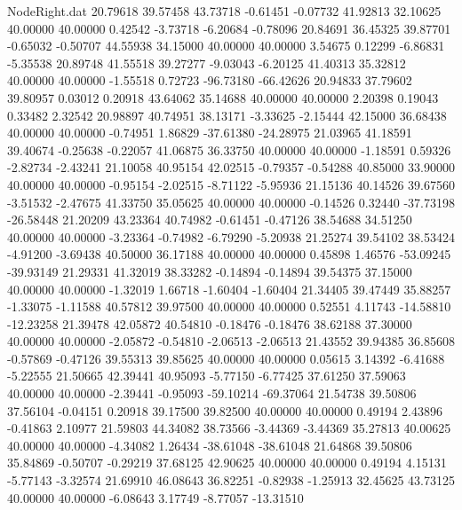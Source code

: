 \begin{filecontents}{NodeRight.dat}
  20.79618   39.57458   43.73718    -0.61451   -0.07732   41.92813   32.10625   40.00000   40.00000    0.42542   -3.73718   -6.20684   -0.78096
  20.84691   36.45325   39.87701    -0.65032   -0.50707   44.55938   34.15000   40.00000   40.00000    3.54675    0.12299   -6.86831   -5.35538
  20.89748   41.55518   39.27277    -9.03043   -6.20125   41.40313   35.32812   40.00000   40.00000   -1.55518    0.72723  -96.73180  -66.42626
  20.94833   37.79602   39.80957     0.03012    0.20918   43.64062   35.14688   40.00000   40.00000    2.20398    0.19043    0.33482    2.32542
  20.98897   40.74951   38.13171    -3.33625   -2.15444   42.15000   36.68438   40.00000   40.00000   -0.74951    1.86829  -37.61380  -24.28975
  21.03965   41.18591   39.40674    -0.25638   -0.22057   41.06875   36.33750   40.00000   40.00000   -1.18591    0.59326   -2.82734   -2.43241
  21.10058   40.95154   42.02515    -0.79357   -0.54288   40.85000   33.90000   40.00000   40.00000   -0.95154   -2.02515   -8.71122   -5.95936
  21.15136   40.14526   39.67560    -3.51532   -2.47675   41.33750   35.05625   40.00000   40.00000   -0.14526    0.32440  -37.73198  -26.58448
  21.20209   43.23364   40.74982    -0.61451   -0.47126   38.54688   34.51250   40.00000   40.00000   -3.23364   -0.74982   -6.79290   -5.20938
  21.25274   39.54102   38.53424    -4.91200   -3.69438   40.50000   36.17188   40.00000   40.00000    0.45898    1.46576  -53.09245  -39.93149
  21.29331   41.32019   38.33282    -0.14894   -0.14894   39.54375   37.15000   40.00000   40.00000   -1.32019    1.66718   -1.60404   -1.60404
  21.34405   39.47449   35.88257    -1.33075   -1.11588   40.57812   39.97500   40.00000   40.00000    0.52551    4.11743  -14.58810  -12.23258
  21.39478   42.05872   40.54810    -0.18476   -0.18476   38.62188   37.30000   40.00000   40.00000   -2.05872   -0.54810   -2.06513   -2.06513
  21.43552   39.94385   36.85608    -0.57869   -0.47126   39.55313   39.85625   40.00000   40.00000    0.05615    3.14392   -6.41688   -5.22555
  21.50665   42.39441   40.95093    -5.77150   -6.77425   37.61250   37.59063   40.00000   40.00000   -2.39441   -0.95093  -59.10214  -69.37064
  21.54738   39.50806   37.56104    -0.04151    0.20918   39.17500   39.82500   40.00000   40.00000    0.49194    2.43896   -0.41863    2.10977
  21.59803   44.34082   38.73566    -3.44369   -3.44369   35.27813   40.00625   40.00000   40.00000   -4.34082    1.26434  -38.61048  -38.61048
  21.64868   39.50806   35.84869    -0.50707   -0.29219   37.68125   42.90625   40.00000   40.00000    0.49194    4.15131   -5.77143   -3.32574
  21.69910   46.08643   36.82251    -0.82938   -1.25913   32.45625   43.73125   40.00000   40.00000   -6.08643    3.17749   -8.77057  -13.31510

\end{filecontents}
